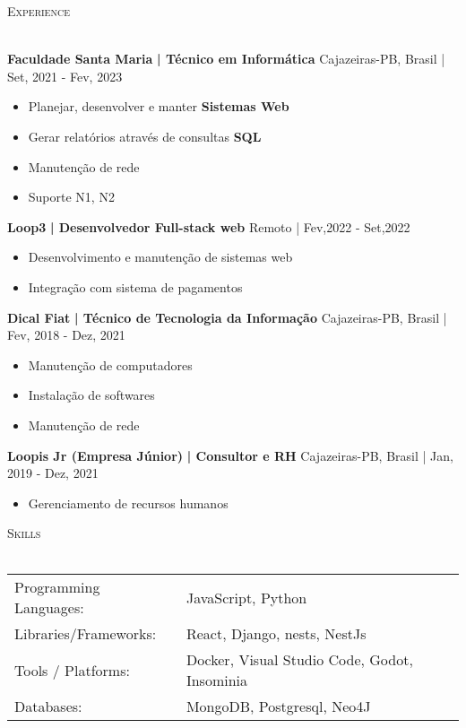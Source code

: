 \documentclass[a4paper]{article}
\newcommand{\lineunder} {
    \vspace*{-8pt} \\
    \hspace*{-18pt} \hrulefill \\
}
\newcommand{\header} [1] {
    {\hspace*{-18pt}\vspace*{6pt} \textsc{#1}}
    \vspace*{-6pt} \lineunder
}
\begin{document}
      \header{Experience}
      \vspace{2mm}

      \textbf{Faculdade Santa Maria}\textbf{ | Técnico em Informática} \hfill Cajazeiras-PB, Brasil | Set, 2021 - Fev, 2023\\
          \vspace{-3mm}
\begin{itemize} \itemsep -3pt
\item  Planejar, desenvolver e manter \textbf{Sistemas Web}
\item  Gerar relatórios através de consultas \textbf{SQL}
\item  Manutenção de rede
\item  Suporte N1, N2
\end{itemize}
      \textbf{Loop3}\textbf{ | Desenvolvedor Full-stack web} \hfill Remoto | Fev,2022 - Set,2022\\
          \vspace{-3mm}
\begin{itemize} \itemsep -3pt
\item  Desenvolvimento e manutenção de sistemas web
\item  Integração com sistema de pagamentos
\end{itemize}
      \textbf{Dical Fiat}\textbf{ | Técnico de Tecnologia da Informação} \hfill Cajazeiras-PB, Brasil | Fev, 2018 - Dez, 2021\\
          \vspace{-3mm}
\begin{itemize} \itemsep -3pt
\item  Manutenção de computadores
\item  Instalação de softwares
\item  Manutenção de rede
\end{itemize}
      \textbf{Loopis Jr (Empresa Júnior)}\textbf{ | Consultor e RH} \hfill Cajazeiras-PB, Brasil | Jan, 2019 - Dez, 2021\\
          \vspace{-3mm}
\begin{itemize} \itemsep -3pt
\item  Gerenciamento de recursos humanos
\end{itemize}

%
%
  \header{Skills}
  \vspace{2mm}
  \begin{longtable}{p{4cm}p{12cm}}
  Programming Languages: & JavaScript, Python \\
  Libraries/Frameworks: & React, Django, nests, NestJs \\
  Tools / Platforms: & Docker, Visual Studio Code, Godot, Insominia \\
  Databases: & MongoDB, Postgresql, Neo4J \\
  \end{longtable}
  \vspace{1mm}
\end{document}
